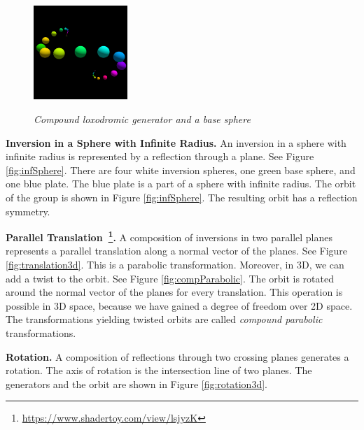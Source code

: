 \begin{figure}[h!tbp]
\begin{minipage}[t]{0.5\hsize}
 \hspace*{\fill}
  \begin{minipage}[t]{0.25\hsize}
   \center
   \includegraphics[width=1.4in, height=1.4in, keepaspectratio]{./img/application/3dGen/compLoxoOneOrb.pdf}
   \label{fig:compLoxoOrb}
  \end{minipage}
  \hspace*{\fill}
  \caption{\textit{Compound loxodromic generator and a base sphere}}
  \label{fig:compLoxo}
 \end{minipage}
\end{figure}

\noindent\textbf{Inversion in a Sphere with Infinite Radius.}
An inversion in a sphere with infinite radius is represented by
a reflection through a plane.
See Figure \ref{fig:infSphere}.
There are four white inversion spheres, one green base sphere,
and one blue plate.
The blue plate is a part of a sphere with infinite radius.
The orbit of the group is shown in Figure
\ref{fig:infSphere}.
The resulting orbit has a reflection symmetry.

\noindent\textbf{Parallel
Translation~\footnote{\url{https://www.shadertoy.com/view/lsjyzK}}.}
A composition of inversions in two parallel planes represents a parallel
translation along a normal vector of the planes.
See Figure \ref{fig:translation3d}.
This is a parabolic transformation.
Moreover, in 3D, we can add a twist to the orbit.
See Figure \ref{fig:compParabolic}.
The orbit is rotated around the normal vector of the planes for every
translation.
This operation is possible in 3D space, because we have gained a degree
of freedom over 2D space.
The transformations yielding twisted orbits are called \textit{compound
parabolic} transformations.

\noindent\textbf{Rotation.}
A composition of reflections through two crossing planes generates a rotation.
The axis of rotation is the intersection line of two planes.
The generators and the orbit are shown in Figure \ref{fig:rotation3d}.


